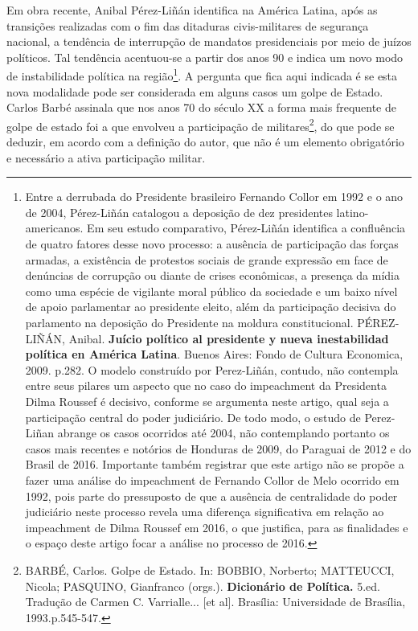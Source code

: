 Em obra recente, Anibal Pérez-Liñán identifica na América Latina, após
as transições realizadas com o fim das ditaduras civis-militares de
segurança nacional, a tendência de interrupção de mandatos presidenciais
por meio de juízos políticos. Tal tendência acentuou-se a partir dos
anos 90 e indica um novo modo de instabilidade política na
região\footnote{Entre a derrubada do Presidente brasileiro Fernando
  Collor em 1992 e o ano de 2004, Pérez-Liñán catalogou a deposição de
  dez presidentes latino-americanos. Em seu estudo comparativo,
  Pérez-Liñán identifica a confluência de quatro fatores desse novo
  processo: a ausência de participação das forças armadas, a existência
  de protestos sociais de grande expressão em face de denúncias de
  corrupção ou diante de crises econômicas, a presença da mídia como uma
  espécie de vigilante moral público da sociedade e um baixo nível de
  apoio parlamentar ao presidente eleito, além da participação decisiva
  do parlamento na deposição do Presidente na moldura constitucional.
  PÉREZ-LIÑÁN, Anibal. \textbf{Juício político al presidente y nueva
  inestabilidad política en América Latina}. Buenos Aires: Fondo de
  Cultura Economica, 2009. p.282. O modelo construído por Perez-Liñán,
  contudo, não contempla entre seus pilares um aspecto que no caso do
  impeachment da Presidenta Dilma Roussef é decisivo, conforme se
  argumenta neste artigo, qual seja a participação central do poder
  judiciário. De todo modo, o estudo de Perez-Liñan abrange os casos
  ocorridos até 2004, não contemplando portanto os casos mais recentes e
  notórios de Honduras de 2009, do Paraguai de 2012 e do Brasil de 2016.
  Importante também registrar que este artigo não se propõe a fazer uma
  análise do impeachment de Fernando Collor de Melo ocorrido em 1992,
  pois parte do pressuposto de que a ausência de centralidade do poder
  judiciário neste processo revela uma diferença significativa em
  relação ao impeachment de Dilma Roussef em 2016, o que justifica, para
  as finalidades e o espaço deste artigo focar a análise no processo de
  2016.}. A pergunta que fica aqui indicada é se esta nova modalidade
pode ser considerada em alguns casos um golpe de Estado. Carlos Barbé
assinala que nos anos 70 do século XX a forma mais frequente de golpe de
estado foi a que envolveu a participação de militares\footnote{BARBÉ,
  Carlos. Golpe de Estado. In: BOBBIO, Norberto; MATTEUCCI, Nicola;
  PASQUINO, Gianfranco (orgs.). \textbf{Dicionário de Política.} 5.ed.
  Tradução de Carmen C. Varrialle... {[}et al{]}. Brasília: Universidade
  de Brasília, 1993.p.545-547.}, do que pode se deduzir, em acordo com a
definição do autor, que não é um elemento obrigatório e necessário a
ativa participação militar.

